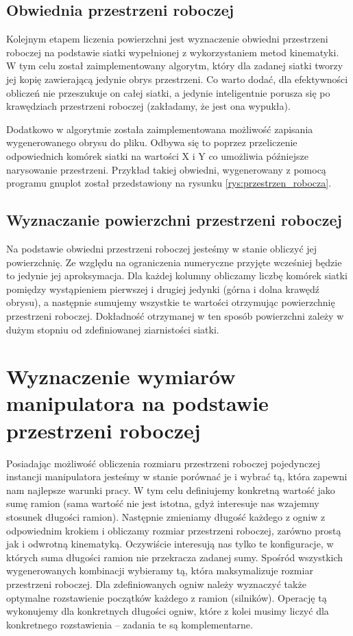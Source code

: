 \documentclass[printmode]{mgr}
\begin{document}
\subsection{Obwiednia przestrzeni roboczej}
Kolejnym etapem liczenia powierzchni jest wyznaczenie obwiedni przestrzeni roboczej na podstawie
siatki wypełnionej z wykorzystaniem metod kinematyki. W tym celu został zaimplementowany algorytm, 
który dla zadanej siatki tworzy jej kopię zawierającą jedynie obrys przestrzeni. Co warto dodać,
dla efektywności obliczeń nie przeszukuje on całej siatki, a jedynie inteligentnie porusza się
po krawędziach przestrzeni roboczej (zakładamy, że jest ona wypukła). 

Dodatkowo w algorytmie została zaimplementowana możliwość zapisania wygenerowanego obrysu do pliku. 
Odbywa się to poprzez przeliczenie odpowiednich komórek siatki na wartości X i Y co umożliwia
późniejsze narysowanie przestrzeni. Przykład takiej obwiedni, wygenerowany z pomocą programu gnuplot
został przedstawiony na rysunku \ref{rys:przestrzen_robocza}. 

\subsection{Wyznaczanie powierzchni przestrzeni roboczej}
Na podstawie obwiedni przestrzeni roboczej jesteśmy w stanie obliczyć jej powierzchnię. 
Ze względu na ograniczenia numeryczne przyjęte wcześniej będzie to jedynie jej aproksymacja. 
Dla każdej kolumny obliczamy liczbę komórek siatki pomiędzy wystąpieniem pierwszej i drugiej jedynki
(górna i dolna krawędź obrysu), a następnie sumujemy wszystkie te wartości otrzymując powierzchnię przestrzeni
roboczej. Dokładność otrzymanej w ten sposób powierzchni zależy w dużym stopniu od zdefiniowanej
ziarnistości siatki. 

\section{Wyznaczenie wymiarów manipulatora na podstawie przestrzeni roboczej}
Posiadając możliwość obliczenia rozmiaru przestrzeni roboczej pojedynczej instancji 
manipulatora jesteśmy w stanie porównać je i wybrać tą, która zapewni nam najlepsze
warunki pracy. W tym celu definiujemy konkretną wartość jako sumę ramion (sama wartość nie jest istotna, gdyż
interesuje nas wzajemny stosunek długości ramion). Następnie zmieniamy długość każdego z ogniw z odpowiednim krokiem
i obliczamy rozmiar przestrzeni roboczej, zarówno prostą jak i odwrotną kinematyką. Oczywiście interesują nas tylko te
konfiguracje, w których suma długości ramion nie przekracza zadanej sumy. Spośród wszystkich wygenerowanych kombinacji wybieramy tą,
która maksymalizuje rozmiar przestrzeni roboczej. Dla zdefiniowanych ogniw należy wyznaczyć także optymalne rozstawienie
początków każdego z ramion (silników). Operację tą wykonujemy dla konkretnych długości ogniw, które z kolei musimy liczyć dla 
konkretnego rozstawienia -- zadania te są komplementarne.
\end{document}
